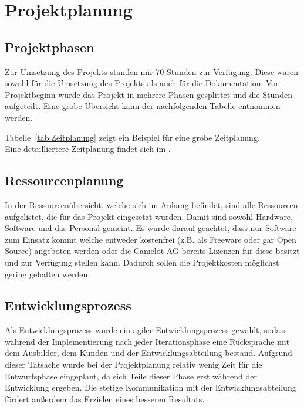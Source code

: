 \section{Projektplanung} 
\label{sec:Projektplanung}


\subsection{Projektphasen}
\label{sec:Projektphasen}
Zur Umsetzung des Projekts standen mir 70 Stunden zur Verfügung. Diese waren sowohl für die Umsetzung des Projekts als auch für die Dokumentation. Vor Projektbeginn wurde das Projekt in mehrere Phasen gesplittet und die Stunden aufgeteilt. Eine grobe Übersicht kann der nachfolgenden Tabelle entnommen werden. 

Tabelle~\ref{tab:Zeitplanung} zeigt ein Beispiel für eine grobe Zeitplanung.
\\
Eine detailliertere Zeitplanung findet sich im .


\subsection{Ressourcenplanung}
\label{sec:Ressourcenplanung}
In der Ressourcenübersicht, welche sich im Anhang befindet, sind alle Ressourcen aufgelistet, die für das Projekt eingesetzt wurden. Damit sind sowohl Hardware, Software und das Personal gemeint. Es wurde darauf geachtet, dass nur Software zum Einsatz kommt welche entweder kostenfrei (z.B. als Freeware oder gar Open Source) angeboten werden oder die Camelot AG bereits Lizenzen für diese besitzt und zur Verfügung stellen kann. Dadurch sollen die Projektkosten möglichst gering gehalten werden. 


\subsection{Entwicklungsprozess}
\label{sec:Entwicklungsprozess}
Als Entwicklungsprozess wurde ein agiler Entwicklungsprozess gewählt, sodass während der Implementierung nach jeder Iterationsphase eine Rücksprache mit dem Ausbilder, dem Kunden und der Entwicklungsabteilung bestand. Aufgrund dieser Tatsache wurde bei der Projektplanung relativ wenig Zeit für die Entwurfsphase eingeplant, da sich Teile dieser Phase erst während der Entwicklung ergeben. Die stetige Kommunikation mit der Entwicklungsabteilung fördert außerdem das Erzielen eines besseren Resultats.
